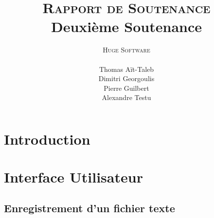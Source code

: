 \documentclass[a4paper,10pt]{report}
\title{\textsc{Rapport de Soutenance} \\ Deuxi\`eme Soutenance}
\author{\textsc{Huge Software}\\ \\ Thomas A\"it-Taleb \\ Dimitri Georgoulis \\ Pierre Guilbert \\ Alexandre Testu}
\date{}
\begin{document}
\lstset{language=C}
\dominitoc
\maketitle
\tableofcontents \pagebreak
\thispagestyle{fancy}

\chapter{Introduction} %
\label{cha:introduction}





\chapter{Interface Utilisateur} %
\label{cha:interface_utilisateur}

	\section{Enregistrement d'un fichier texte} %
	\label{sec:enregistrement_d_un_fichier_texte}
\end{document}
